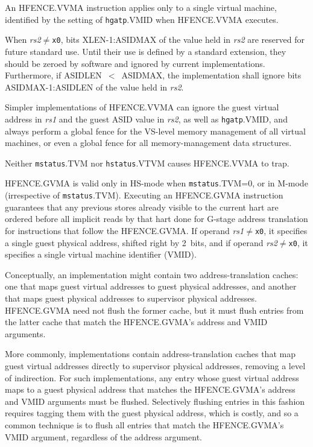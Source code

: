 \begin{commentary}
An HFENCE.VVMA instruction applies only to a single virtual machine, identified
by the setting of {\tt hgatp}.VMID when HFENCE.VVMA executes.
\end{commentary}

When {\em rs2}$\neq${\tt x0}, bits XLEN-1:ASIDMAX of the value held in {\em
rs2} are reserved for future standard use.  Until their use is defined by a
standard extension, they should be zeroed by software and ignored
by current implementations.
Furthermore, if ASIDLEN~$<$~ASIDMAX, the implementation shall ignore bits
ASIDMAX-1:ASIDLEN of the value held in {\em rs2}.

\begin{commentary}
Simpler implementations of HFENCE.VVMA can ignore the guest virtual address in
{\em rs1} and the guest ASID value in {\em rs2}, as well as {\tt hgatp}.VMID,
and always perform a global fence for the VS-level memory management of all
virtual machines, or even a global fence for all memory-management data
structures.
\end{commentary}

Neither {\tt mstatus}.TVM nor {\tt hstatus}.VTVM causes HFENCE.VVMA to
trap.

HFENCE.GVMA is valid only in HS-mode when {\tt mstatus}.TVM=0, or in
M-mode (irrespective of {\tt mstatus}.TVM).
Executing an HFENCE.GVMA instruction guarantees that any previous stores
already visible to the current hart are ordered before all implicit
reads by that hart done for G-stage address translation for instructions
that follow the HFENCE.GVMA.
If operand {\em rs1}$\neq${\tt x0}, it specifies a single guest physical
address, shifted right by 2~bits, and if operand {\em rs2}$\neq${\tt x0}, it
specifies a single virtual machine identifier (VMID).

\begin{commentary}
Conceptually, an implementation might contain two address-translation caches:
one that maps guest virtual addresses to guest physical addresses, and another
that maps guest physical addresses to supervisor physical addresses.
HFENCE.GVMA need not flush the former cache, but it must flush entries from
the latter cache that match the HFENCE.GVMA's address and VMID arguments.

More commonly, implementations contain address-translation caches that map
guest virtual addresses directly to supervisor physical addresses, removing
a level of indirection.
For such implementations, any entry whose guest virtual address maps to
a guest physical address that matches the HFENCE.GVMA's address and VMID
arguments must be flushed.
Selectively flushing entries in this fashion requires tagging them with
the guest physical address, which is costly, and so a common technique is
to flush all entries that match the HFENCE.GVMA's VMID argument, regardless
of the address argument.
\end{commentary}

